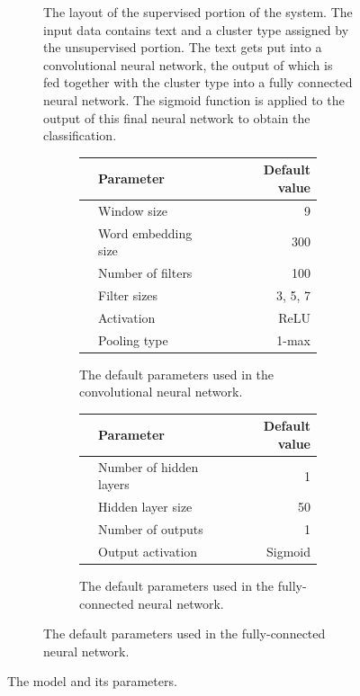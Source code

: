 \begin{figure}[htbp]
\begin{subfigure}[b]{0.45\textwidth}
    \caption{The layout of the supervised portion of the system. The input data
      contains text and a cluster type assigned by the unsupervised portion. The
      text gets put into a convolutional neural network, the output of which is
      fed together with the cluster type into a fully connected neural network.
      The sigmoid function is applied to the output of this final neural network
    to obtain the classification.}%
    \label{fig:nn_layout}
  \end{subfigure}
  \hspace{0.05\textwidth}
  \begin{subfigure}[b]{0.45\textwidth}
    \begin{subfigure}[b]{\textwidth}
      \centering
      \begin{tabular}{llr}
	\toprule
	& Parameter & Default value \\
	\midrule
	& Window size & 9 \\
	& Word embedding size & 300 \\
	& Number of filters & 100 \\
	& Filter sizes & 3, 5, 7 \\
	& Activation & ReLU \\
	& Pooling type & 1-max \\
	\bottomrule
      \end{tabular}
      \caption{The default parameters used in the convolutional neural network.}
    \end{subfigure}

    \begin{subfigure}[b]{\textwidth}
      \centering
      \begin{tabular}{llr}
	\toprule
	& Parameter & Default value \\
	\midrule
	& Number of hidden layers & 1 \\
	& Hidden layer size & 50 \\
	& Number of outputs & 1 \\
	& Output activation & Sigmoid \\
	\bottomrule
      \end{tabular}
      \caption{The default parameters used in the fully-connected neural network.}
    \end{subfigure}
  \end{subfigure}
  \caption{The model and its parameters.}%
  \label{fig:model_full}
\end{figure}

